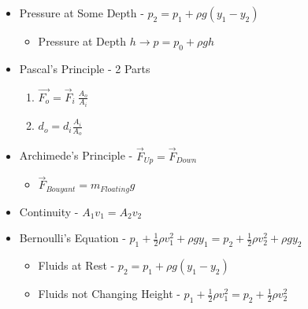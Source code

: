 \documentclass[10pt,letterpaper,final,twoside,notitlepage]{article}
\begin{document}
	\begin{itemize}[noitemsep]
		\item Pressure at Some Depth - $p_{2} = p_{1} + \rho g \left( y_{1}-y_{2} \right)$
			\begin{itemize}
				\item Pressure at Depth $h \rightarrow p = p_{0} + \rho gh$
			\end{itemize}
		\item Pascal's Principle - 2 Parts
			\begin{enumerate}[noitemsep]
				\item $\vec{F_{o}} = \vec{F}_{i}\ \frac{A_{o}}{A_{i}}$
				\item $d_{o} = d_{i} \frac{A_{i}}{A_{o}}$
			\end{enumerate}
		\item Archimede's Principle - $\vec{F}_{Up} = \vec{F}_{Down}$
			\begin{itemize}[noitemsep]
				\item $\vec{F}_{Bouyant} = m_{Floating}g$
			\end{itemize}
		\item Continuity - $A_{1}v_{1} = A_{2}v_{2}$
		\item Bernoulli's Equation - $p_{1} + \frac{1}{2} \rho v_{1}^{2} + \rho gy_{1} = p_{2} + 	\frac{1}{2} \rho v_{2}^{2} + \rho gy_{2}$
			\begin{itemize}[noitemsep]
				\item Fluids at Rest - $p_{2} = p_{1} + \rho g \left( y_{1}-y_{2} \right)$
				\item Fluids not Changing Height - $p_{1} + \frac{1}{2} \rho v_{1}^{2} = p_{2} + 	\frac{1}{2} \rho v_{2}^{2}$
			\end{itemize}
	\end{itemize}
\end{document}
